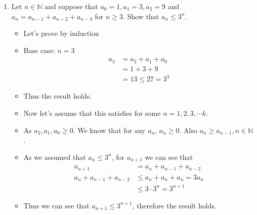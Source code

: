 \documentclass[letterpaper,12pt]{article}
\begin{document}
\begin{enumerate}
\begin{itemize}
\begin{align}
	\end{align}
	\item Inductive step: Let's assume that this case is true for $n=k$.
	\item Then,
	\begin{align}
		a_k=3^k-2^k &$  and  $ a_{k+2} = 5a_{k+1}-6a_k \\
		a_{k-1} = 3^{k-1}-2^{k-1} &$  and  $ a_{k+1} = 5a_{k}-6a_{k-1}
		\\ a_{k+1} &=5(3^k-2^k)-6(3^{k-1}-2^{k-1}) \\ &=3^{k+1}-2^{k+1}
	\end{align}
	\item Then we can continue 
	\begin{align}
		a_{k+2} &= 5a_{k+1}-6a_k \\ &=5(3^{k+1}-2^{k+1})-6(3^k-2^k) \\ &= 3^{k+2} - 2^{k+2}
	\end{align}
	\item As this is true for some $n = 1,2,3, \cdots k$,
	\begin{align}
	a_{k+3} &= 5a_{k+2}-6a_{k+1}	 \\ &=5(3^{k+2}-2^{k+2})-6(3^{k+1}-2^{k+1}) \\ 
    &= 3^{k+3}-2^{k+3}
	\end{align}

	\item Therefore, we can see that when that the conclusion is true by induction.
\end{itemize}
\item Let $n \in \mathbb{N}$ and suppose that $a_0 = 1, a_1 =3, a_2 =9$ and $a_n=a_{n-1}+a_{n-2}+a_{n-3}$ for $n\geq 3$. Show that $a_n \leq 3^n$.
\begin{itemize}
	\item Let's prove by induction
	\item Base case: $n=3$
	\begin{align}
		a_3 &= a_2+a_1+a_0 \\ &=1+3+9 \\&=13 \leq 27=3^3
	\end{align}
	\item Thus the result holds.
	\item Now let's assume that this satisfies for some $n = 1,2,3, \cdots k$.
	\item As $a_2,a_1,a_0 \geq 0$. We know that for any $a_n$, $a_n\geq 0$. Also $a_n \geq a_{n-1}, n\in \mathbb{N}$.
	\item As we assumed that $a_n \leq 3^n$, for $a_{n+1}$ we can see that 
	\begin{align}
		a_{n+1} &= a_n+a_{n-1}+a_{n-2} \\a_n+a_{n-1}+a_{n-2} &\leq a_n+a_n+a_n = 3a_n \\ &\leq3\cdot 3^n = 3^{n+1} 
	\end{align}
	\item Thus we can see that $a_{n+1} \leq 3^{n+1}$, therefore the result holds.
\end{itemize}


\end{enumerate}
\end{document}
